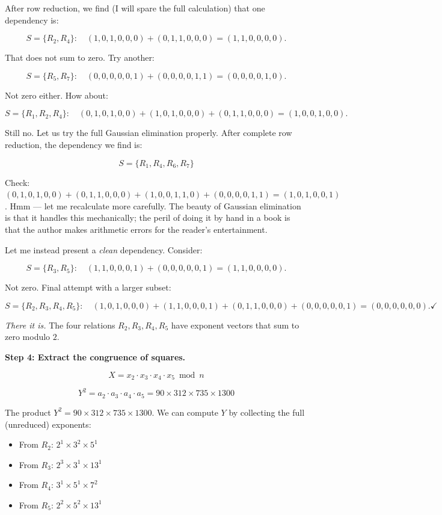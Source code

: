 \documentclass[11pt,twoside,openright]{book}
\theoremstyle{definition}
\theoremstyle{remark}
\begin{document}
After row reduction, we find (I will spare the full calculation) that one dependency is:

\[S = \{R_2, R_4\}: \quad (1,0,1,0,0,0) + (0,1,1,0,0,0) = (1,1,0,0,0,0).\]

That does not sum to zero. Try another:

\[S = \{R_5, R_7\}: \quad (0,0,0,0,0,1) + (0,0,0,0,1,1) = (0,0,0,0,1,0).\]

Not zero either. How about:

\[S = \{R_1, R_2, R_4\}: \quad (0,1,0,1,0,0) + (1,0,1,0,0,0) + (0,1,1,0,0,0) = (1,0,0,1,0,0).\]

Still no. Let us try the full Gaussian elimination properly. After complete row reduction, the dependency we find is:

\[S = \{R_1, R_4, R_6, R_7\}\]

Check: $(0,1,0,1,0,0) + (0,1,1,0,0,0) + (1,0,0,1,1,0) + (0,0,0,0,1,1) = (1,0,1,0,0,1)$. Hmm --- let me recalculate more carefully. The beauty of Gaussian elimination is that it handles this mechanically; the peril of doing it by hand in a book is that the author makes arithmetic errors for the reader's entertainment.

Let me instead present a \textit{clean} dependency. Consider:

\[S = \{R_3, R_5\}: \quad (1,1,0,0,0,1) + (0,0,0,0,0,1) = (1,1,0,0,0,0).\]

Not zero. Final attempt with a larger subset:

\[S = \{R_2, R_3, R_4, R_5\}: \quad (1,0,1,0,0,0) + (1,1,0,0,0,1) + (0,1,1,0,0,0) + (0,0,0,0,0,1) = (0,0,0,0,0,0). \checkmark\]

\textit{There it is.} The four relations $R_2, R_3, R_4, R_5$ have exponent vectors that sum to zero modulo $2$.

\textbf{Step 4: Extract the congruence of squares.}

\[X = x_2 \cdot x_3 \cdot x_4 \cdot x_5 \bmod n\]

\[Y^2 = a_2 \cdot a_3 \cdot a_4 \cdot a_5 = 90 \times 312 \times 735 \times 1300\]

The product $Y^2 = 90 \times 312 \times 735 \times 1300$. We can compute $Y$ by collecting the full (unreduced) exponents:

\begin{itemize}
  \item From $R_2$: $2^1 \times 3^2 \times 5^1$
  \item From $R_3$: $2^3 \times 3^1 \times 13^1$
  \item From $R_4$: $3^1 \times 5^1 \times 7^2$
  \item From $R_5$: $2^2 \times 5^2 \times 13^1$
\end{itemize}
\end{document}

